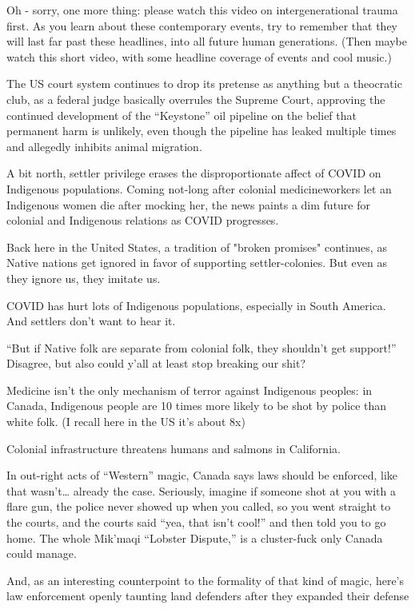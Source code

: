 \documentclass[11pt]{article}
\begin{document}
\begin{itemize}
Oh - sorry, one more thing: please watch this video on intergenerational trauma first. As you learn about these contemporary events, try to remember that they will last far past these headlines, into all future human generations. (Then maybe watch this short video, with some headline coverage of events and cool music.)

The US court system continues to drop its pretense as anything but a theocratic club, as a federal judge basically overrules the Supreme Court, approving the continued development of the “Keystone” oil pipeline on the belief that permanent harm is unlikely, even though the pipeline has leaked multiple times and allegedly inhibits animal migration.

A bit north, settler privilege erases the disproportionate affect of COVID on Indigenous populations. Coming not-long after colonial medicineworkers let an Indigenous women die after mocking her, the news paints a dim future for colonial and Indigenous relations as COVID progresses.

Back here in the United States, a tradition of "broken promises" continues, as Native nations get ignored in favor of supporting settler-colonies. But even as they ignore us, they imitate us.

COVID has hurt lots of Indigenous populations, especially in South America. And settlers don't want to hear it.

“But if Native folk are separate from colonial folk, they shouldn’t get support!” Disagree, but also could y’all at least stop breaking our shit?

Medicine isn’t the only mechanism of terror against Indigenous peoples: in Canada, Indigenous people are 10 times more likely to be shot by police than white folk. (I recall here in the US it’s about 8x)

Colonial infrastructure threatens humans and salmons in California.

In out-right acts of “Western” magic, Canada says laws should be enforced, like that wasn’t… already the case. Seriously, imagine if someone shot at you with a flare gun, the police never showed up when you called, so you went straight to the courts, and the courts said “yea, that isn’t cool!” and then told you to go home. The whole Mik’maqi “Lobster Dispute,” is a cluster-fuck only Canada could manage.

And, as an interesting counterpoint to the formality of that kind of magic, here’s law enforcement openly taunting land defenders after they expanded their defense


\end{itemize}
\end{document}
